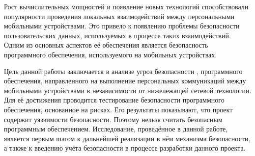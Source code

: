 %
Рост вычислительных мощностей и появление новых технологий способствовали популярности проведения локальных взаимодействий между персональными мобильными устройствами. 
%
Это привело к появлению проблемы безопасности пользовательских данных, используемых в процессе таких взаимодействий. 
%
Одним из основных аспектов её обеспечения является безопасность программного обеспечения, используемого на мобильных устройствах. 

%
%
Цель данной работы заключается в анализе угроз безопасности , программного обеспечения, направленного на выполнение персональных коммуникаций между мобильными устройствами в независимости от нижележащей сетевой технологии. 
%
Для её достижения проводится тестирование безопасности программного обеспечения, основанное на рисках. 
%
Его результаты показывают, что проект содержит уязвимости безопасности.
%
Поэтому  нельзя считать безопасным программным обеспечением. 
%
Исследование, проведённое в данной работе, является первым шагом к дальнейшей реализации в нём механизма безопасности, а также к введению учёта безопасности в процессе разработки данного проекта.

